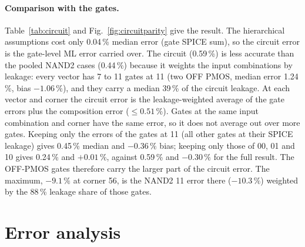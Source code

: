 \documentclass[11pt,a4paper]{article}
\begin{document}
\paragraph{Comparison with the gates.} Table~\ref{tab:circuit} and Fig.~\ref{fig:circuitparity} give the
result. The hierarchical assumptions cost only 0.04\,\% median error (gate SPICE sum), so the circuit
error is the gate-level ML error carried over. The circuit (0.59\,\%) is less accurate than the pooled
NAND2 cases (0.44\,\%) because it weights the input combinations by leakage: every vector has 7 to 11
gates at 11 (two OFF PMOS, median error 1.24\,\%, bias $-1.06\,\%$), and they carry a median 39\,\% of the
circuit leakage. At each vector and corner the circuit error is the leakage-weighted average of the gate
errors plus the composition error ($\le 0.51\,\%$). Gates at the same input combination and corner have
the same error, so it does not average out over more gates. Keeping only the errors of the gates at 11
(all other gates at their SPICE leakage) gives 0.45\,\% median and $-0.36\,\%$ bias; keeping only those of
00, 01 and 10 gives 0.24\,\% and $+0.01\,\%$, against 0.59\,\% and $-0.30\,\%$ for the full result. The
OFF-PMOS gates therefore carry the larger part of the circuit error. The maximum, $-9.1\,\%$ at corner 56,
is the NAND2 11 error there ($-10.3\,\%$) weighted by the 88\,\% leakage share of those gates.

\section{Error analysis}\label{sec:errors}
\end{document}
